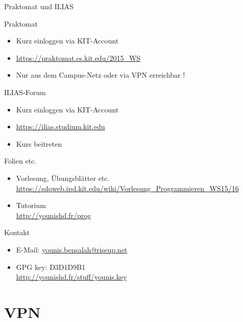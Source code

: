 \documentclass[18pt]{beamer}
\begin{document}
\begin{frame}{Praktomat und ILIAS}
    \begin{block}{Praktomat}
        \begin{itemize}
            \item Kurz einloggen via KIT-Account
            \item \url{https://praktomat.cs.kit.edu/2015\_WS}
            \item Nur aus dem Campus-Netz oder via VPN erreichbar !
        \end{itemize}
    \end{block}
    \pause

    \begin{block}{ILIAS-Forum}
        \begin{itemize}
            \item Kurz einloggen via KIT-Account
            \item \url{https://ilias.studium.kit.edu}
            \item Kurs beitreten
        \end{itemize}
    \end{block}
\end{frame}

\begin{frame}{Folien etc.}
    \begin{itemize}
        \item Vorlesung, Übungsblätter etc.\\ \url{https://sdqweb.ipd.kit.edu/wiki/Vorlesung\_Programmieren\_WS15/16}
        \item Tutorium \\ \url{http://younishd.fr/prog}
    \end{itemize}
\end{frame}

\begin{frame}{Kontakt}
    \begin{itemize}
        \item E-Mail: \url{younis.bensalah@riseup.net}
        \item GPG key: D3D1D9B1\\ \url{http://younishd.fr/stuff/younis.key}
    \end{itemize}
\end{frame}

\section{VPN}
\end{document}
